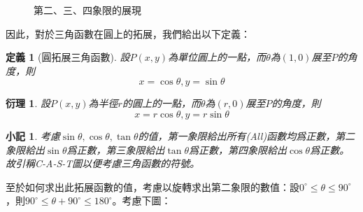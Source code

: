 \documentclass[12pt]{article}
\newtheorem{definition}{定義}
\newtheorem*{corollary}{衍理}
\newtheorem*{remark}{小記}
\begin{document}
\begin{figure}[H]
        \caption{第二、三、四象限的展現}
    \end{figure}

    因此，對於三角函數在圓上的拓展，我們給出以下定義：

    \begin{definition}[圓拓展三角函數]
        設$P(x,y)$為單位圓上的一點，而$\theta$為$(1,0)$展至$P$的角度，則$$x=\cos{\theta}, y=\sin{\theta}$$
    \end{definition}

    \begin{corollary}
        設$P(x,y)$為半徑$r$的圓上的一點，而$\theta$為$(r,0)$展至$P$的角度，則$$x=r\cos{\theta}, y=r\sin{\theta}$$
    \end{corollary}

    \begin{remark}
        考慮$\sin{\theta},\cos{\theta},\tan{\theta}$的值，第一象限給出所有(All)函數均爲正數，第二象限給出$\sin{\theta}$爲正數，第三象限給出$\tan{\theta}$爲正數，第四象限給出$\cos{\theta}$爲正數。故引稱C-A-S-T圖以便考慮三角函數的符號。
    \end{remark}

    至於如何求出此拓展函數的值，考慮以旋轉求出第二象限的數值：設$0^\circ\leq\theta\leq 90^\circ$，則$90^\circ\leq\theta+90^\circ\leq 180^\circ$。考慮下圖：
\end{document}
